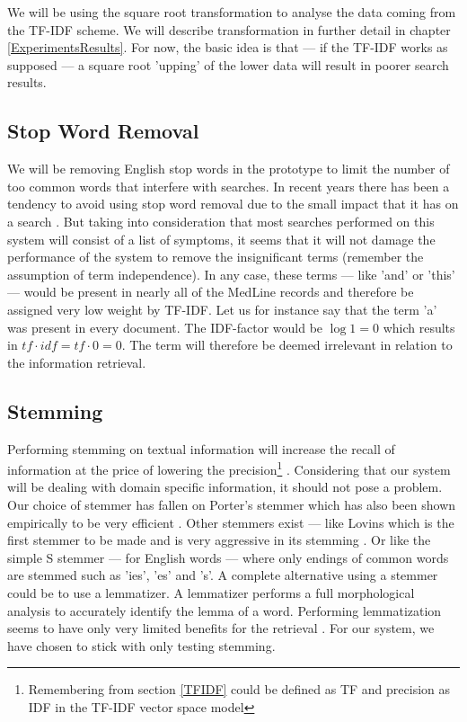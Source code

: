 We will be using the square root transformation to analyse the data
coming from the TF-IDF scheme. We will describe transformation in
further detail in chapter \ref{ExperimentsResults}. For now, the basic idea is that --- if the TF-IDF
works as supposed --- a square root 'upping' of the lower data will
result in poorer search results.

\subsection{Stop Word Removal}

We will be removing English stop words in the prototype to limit the
number of too common words that interfere with searches. In recent
years there has been a tendency to avoid using stop word removal due
to the small impact that it has on a search \cite{IntroIR2009}. But
taking into consideration that most searches performed on this system
will consist of a list of symptoms, it seems that it will not damage
the performance of the system to remove the insignificant terms
(remember the assumption of term independence). In any case, these
terms --- like 'and' or 'this' --- would be present in nearly all of
the MedLine records and therefore be assigned very low weight by
TF-IDF. Let us for instance say that the term 'a' was present in every
document. The IDF-factor would be $\log 1 = 0$ which results in
$\mathit{tf} \cdot \mathit{idf} = \mathit{tf} \cdot 0 = 0$. The term
will therefore be deemed irrelevant in relation to the information
retrieval.

\subsection{Stemming}

Performing stemming on textual information will increase the recall of
information at the price of lowering the
precision\footnote{Remembering from section \ref{TFIDF} could be
  defined as TF and precision as IDF in the TF-IDF vector space model}
\cite{IntroIR2009}. Considering that our system will be dealing with
domain specific information, it should not pose a problem. Our choice
of stemmer has fallen on Porter's stemmer which has also been shown
empirically to be very efficient \cite{IntroIR2009}. Other stemmers
exist --- like Lovins which is the first stemmer to be made and is
very aggressive in its stemming \cite{Kurz2002309}. Or like the simple
S stemmer --- for English words --- where only endings of common words
are stemmed such as 'ies', 'es' and 's'. A complete alternative using
a stemmer could be to use a lemmatizer. A lemmatizer performs a full
morphological analysis to accurately identify the lemma of a word. Performing
lemmatization seems to have only very limited benefits for the
retrieval \cite{IntroIR2009}. For our system, we have chosen to stick with only
testing stemming.

